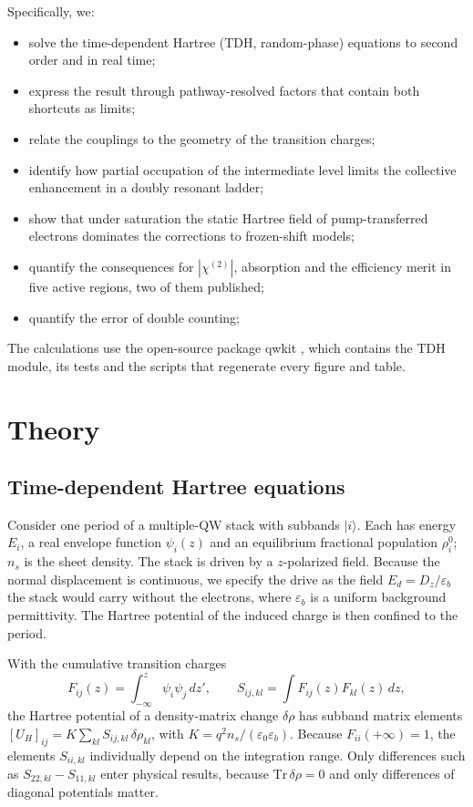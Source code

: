 \documentclass[11pt]{article}
\newcommand{\chitwo}{\chi^{(2)}}
\begin{document}
Specifically, we:
\begin{itemize}
\item solve the time-dependent Hartree (TDH, random-phase) equations to second order and in real time;
\item express the result through pathway-resolved factors that contain both shortcuts as limits;
\item relate the couplings to the geometry of the transition charges;
\item identify how partial occupation of the intermediate level limits the collective enhancement in a doubly resonant ladder;
\item show that under saturation the static Hartree field of pump-transferred electrons dominates the corrections to frozen-shift models;
\item quantify the consequences for $|\chitwo|$, absorption and the efficiency merit in five active regions, two of them published;
\item quantify the error of double counting;
\end{itemize}
The calculations use the open-source package qwkit \cite{qwkit}, which contains the TDH module, its tests and the scripts that regenerate every figure and table.

\section{Theory}\label{sec:theory}
\subsection{Time-dependent Hartree equations}
Consider one period of a multiple-QW stack with subbands $|i\rangle$. Each has energy $E_i$, a real envelope function $\psi_i(z)$ and an equilibrium fractional population $\rho^0_i$; $n_s$ is the sheet density. The stack is driven by a $z$-polarized field. Because the normal displacement is continuous, we specify the drive as the field $E_d=D_z/\varepsilon_b$ the stack would carry without the electrons, where $\varepsilon_b$ is a uniform background permittivity. The Hartree potential of the induced charge is then confined to the period.

With the cumulative transition charges
\begin{equation}
F_{ij}(z)=\int_{-\infty}^{z}\psi_i\psi_j\,dz',\qquad S_{ij,kl}=\int F_{ij}(z)F_{kl}(z)\,dz,\label{eq:S}
\end{equation}
the Hartree potential of a density-matrix change $\delta\rho$ has subband matrix elements $[U_H]_{ij}=K\sum_{kl}S_{ij,kl}\,\delta\rho_{kl}$, with $K=q^2n_s/(\varepsilon_0\varepsilon_b)$. Because $F_{ii}(+\infty)=1$, the elements $S_{ii,kl}$ individually depend on the integration range. Only differences such as $S_{22,kl}-S_{11,kl}$ enter physical results, because $\mathrm{Tr}\,\delta\rho=0$ and only differences of diagonal potentials matter.
\end{document}
